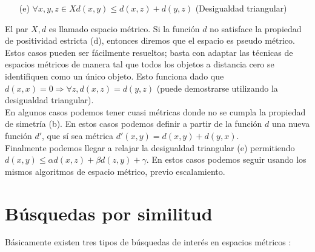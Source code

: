 \begin{enumerate}
\item  [(e)] $\forall x,y,z \in X d(x,y) \leq d(x,z) + d(y,z)$ (Desigualdad triangular)
\end{enumerate}

El par $X,d$ es llamado espacio m\'etrico. Si la funci\'on $d$ no satisface la propiedad de positividad estricta (d), entonces diremos que el espacio es pseudo m\'etrico. Estos casos pueden ser f\'acilmente resueltos; basta con adaptar las t\'ecnicas de espacios m\'etricos de manera tal que todos los objetos a distancia cero se identifiquen como un \'unico objeto. Esto funciona dado que $d(x,x) = 0 \Rightarrow \forall z, d(x,z) = d(y,z)$ (puede demostrarse utilizando la desigualdad triangular).\\

En algunos casos podemos tener cuasi m\'etricas donde no se cumpla la propiedad de simetr\'ia (b). En estos casos podemos definir a partir de la funci\'on $d$ una nueva funci\'on $d'$, que s\'i sea m\'etrica $d'(x,y) = d(x,y) + d(y,x)$.\\

Finalmente podemos llegar a relajar la desigualdad triangular (e) permitiendo $d(x,y)  \leq \alpha d(x,z) +  \beta d(z,y) + \gamma$. En estos casos podemos seguir usando los mismos algoritmos de espacio m\'etrico, previo escalamiento.\\


\section{B\'usquedas por similitud}
B\'asicamente existen tres tipos de b\'usquedas de inter\'es en espacios m\'etricos \cite{oursurvey}:


